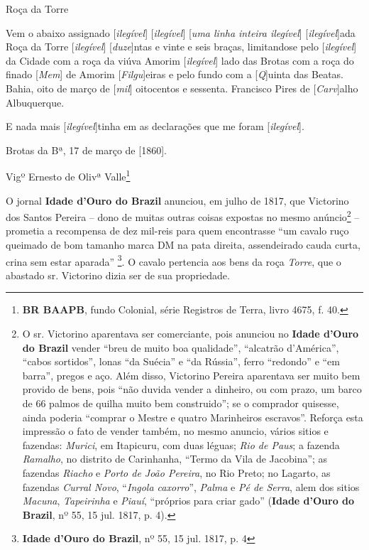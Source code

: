 \begin{citacao}
Roça da Torre

Vem o abaixo assignado [\textit{ilegível}] [\textit{ilegível}] [\textit{uma linha inteira ilegível}] [\textit{ilegível}]ada Roça da Torre [\textit{ilegível}] [\textit{duze}]ntas e vinte e seis braças, limitandose pelo [\textit{ilegível}] da Cidade com a roça da viúva Amorim [\textit{ilegível}] lado das Brotas com a roça do finado [\textit{Mem}] de Amorim [\textit{Filgu}]eiras e pelo fundo com a [\textit{Q}]uinta das Beatas. Bahia, oito de março de [\textit{mil}] oitocentos e sessenta. Francisco Pires de [\textit{Carv}]alho Albuquerque. 

E nada mais [\textit{ilegível}]tinha em as declarações que me foram [\textit{ilegível}].

Brotas da Bª, 17 de março de [1860].

Vigº Ernesto de Olivª Valle\footnote{\textbf{BR BAAPB}, fundo Colonial, série Registros de Terra, livro 4675, f. 40.}
\end{citacao}

O jornal \textbf{Idade d'Ouro do Brazil} anunciou, em julho de 1817, que Victorino dos Santos Pereira -- dono de muitas outras coisas expostas no mesmo anúncio\footnote{O sr. Victorino aparentava ser comerciante, pois anunciou no \textbf{Idade d'Ouro do Brazil} vender ``breu de muito boa qualidade'', ``alcatrão d'América'', ``cabos sortidos'', lonas ``da Suécia'' e ``da Rússia'', ferro ``redondo'' e ``em barra'', pregos e aço. Além disso, Victorino Pereira aparentava ser muito bem provido de bens, pois ``não duvida vender a dinheiro, ou com prazo, um barco de 66 palmos de quilha muito bem construido''; se o comprador quisesse, ainda poderia ``comprar o Mestre e quatro Marinheiros escravos''. Reforça esta impressão o fato de vender também, no mesmo anuncio, vários sitios e fazendas: \textit{Murici}, em Itapicuru, com duas léguas; \textit{Rio de Paus}; a fazenda \textit{Ramalho}, no distrito de Carinhanha, ``Termo da Vila de Jacobina''; as fazendas \textit{Riacho} e \textit{Porto de João Pereira}, no Rio Preto; no Lagarto, as fazendas \textit{Curral Novo}, ``\textit{Ingola caxorro}'', \textit{Palma} e \textit{Pé de Serra}, alem dos sitios \textit{Macuna}, \textit{Tapeirinha} e \textit{Piauí}, ``próprios para criar gado'' (\textbf{Idade d'Ouro do Brazil}, nº 55, 15 jul. 1817, p. 4).} -- prometia a recompensa de dez mil-reis para quem encontrasse ``um cavalo ruço queimado de bom tamanho marca DM na pata direita, assendeirado cauda curta, crina sem estar aparada'' \footnote{\textbf{Idade d'Ouro do Brazil}, nº 55, 15 jul. 1817, p. 4}. O cavalo pertencia aos bens da roça \textit{Torre}, que o abastado sr. Victorino dizia ser de sua propriedade.

